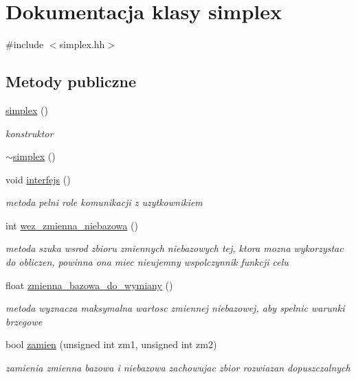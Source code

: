 \hypertarget{classsimplex}{\section{Dokumentacja klasy simplex}
\label{classsimplex}
}


{\ttfamily \#include $<$simplex.\-hh$>$}

\subsection*{Metody publiczne}
\begin{DoxyCompactItemize}
\item 
\hyperlink{classsimplex_a8aaeb28157215071b929373ec0359653}{simplex} ()
\begin{DoxyCompactList}\small\item\em konstruktor \end{DoxyCompactList}\item 
\hyperlink{classsimplex_a5044f01be0ce221495ee6b5a8412f8ab}{$\sim$simplex} ()
\item 
void \hyperlink{classsimplex_ac7494f9db23d8427651e46e1486a9d0f}{interfejs} ()
\begin{DoxyCompactList}\small\item\em metoda pelni role komunikacji z uzytkownikiem \end{DoxyCompactList}\item 
int \hyperlink{classsimplex_a01704cb7296e0928cf49693c3d65e44c}{wez\-\_\-zmienna\-\_\-niebazowa} ()
\begin{DoxyCompactList}\small\item\em metoda szuka wsrod zbioru zmiennych niebazowych tej, ktora mozna wykorzystac do obliczen, powinna ona miec nieujemny wspolczynnik funkcji celu \end{DoxyCompactList}\item 
float \hyperlink{classsimplex_abc52480272f5f2232b0acbed66e2edfe}{zmienna\-\_\-bazowa\-\_\-do\-\_\-wymiany} ()
\begin{DoxyCompactList}\small\item\em metoda wyznacza maksymalna wartosc zmiennej niebazowej, aby spelnic warunki brzegowe \end{DoxyCompactList}\item 
bool \hyperlink{classsimplex_a617d3b460646d213e25c84c5775f43bb}{zamien} (unsigned int zm1, unsigned int zm2)
\begin{DoxyCompactList}\small\item\em zamienia zmienna bazowa i niebazowa zachowujac zbior rozwiazan dopuszczalnych \end{DoxyCompactList}\item 

\end{DoxyCompactItemize}
